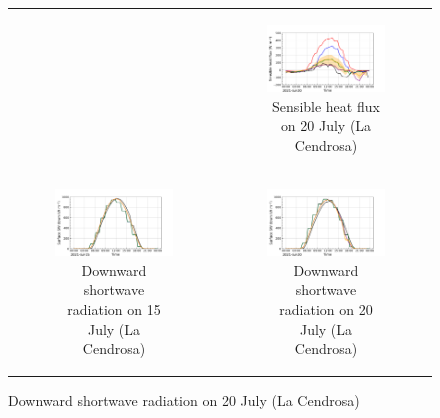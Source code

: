 \begin{figure}[hbtp]
\begin{tabular}{cc}
\begin{subfigure}[t]{0.5\textwidth}
        \end{subfigure} &
        \begin{subfigure}[t]{0.5\textwidth}
            \caption{Sensible heat flux on 20 July (La Cendrosa)}
            \includegraphics[width=\textwidth]{images/chap5/IOP_TS/TS_2021-07-20_cendrosa_sens.png}
        \end{subfigure} \\
        \begin{subfigure}[t]{0.5\textwidth}
            \caption{Downward shortwave radiation on 15 July (La Cendrosa)}
            \includegraphics[width=\textwidth]{images/chap5/IOP_TS/TS_2021-07-15_cendrosa_SWdnSFC.png}
        \end{subfigure} &
        \begin{subfigure}[t]{0.5\textwidth}
            \caption{Downward shortwave radiation on 20 July (La Cendrosa)}
            \includegraphics[width=\textwidth]{images/chap5/IOP_TS/TS_2021-07-20_cendrosa_SWdnSFC.png}

\end{subfigure}
\end{tabular}
\end{figure}
